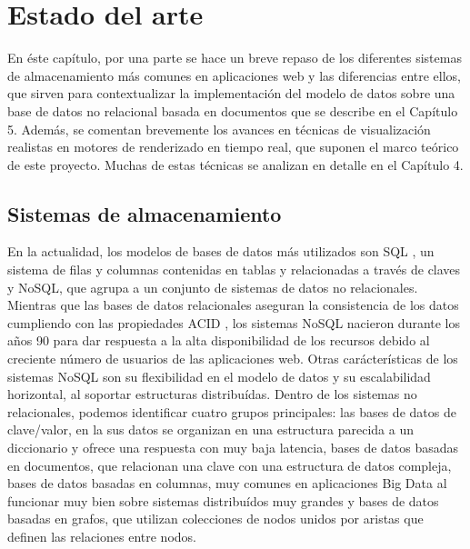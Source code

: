 \chapter{Estado del arte}
En \'este cap\'itulo, por una parte se hace un breve repaso de los diferentes sistemas de almacenamiento m\'as comunes en aplicaciones web
y las diferencias entre ellos, que sirven para contextualizar la implementaci\'on del modelo de datos sobre una base de datos no
relacional basada en documentos que se describe en el Cap\'itulo 5.
Adem\'as, se comentan brevemente los avances en t\'ecnicas de visualizaci\'on realistas en motores de renderizado en tiempo real, que suponen
el marco te\'orico de este proyecto. Muchas de estas t\'ecnicas se analizan en detalle en el Cap\'itulo 4.


\section{Sistemas de almacenamiento}
En la actualidad, los modelos de bases de datos m\'as utilizados son SQL \autocite{sql}, un sistema de filas y columnas
contenidas en tablas y relacionadas a trav\'es de claves y NoSQL, que agrupa a un conjunto de sistemas de datos no relacionales.
Mientras que las bases de datos relacionales aseguran la consistencia de los datos cumpliendo con las propiedades ACID
\autocite{acid}, los sistemas NoSQL nacieron durante los a\~nos 90 para dar respuesta a la alta disponibilidad de los recursos debido al creciente
n\'umero de usuarios de las aplicaciones web. Otras car\'acter\'isticas de los sistemas NoSQL son su flexibilidad en el modelo de datos
y su escalabilidad horizontal, al soportar estructuras distribu\'idas. Dentro de los sistemas no relacionales, podemos identificar
cuatro grupos principales: las bases de datos de clave/valor, en la sus datos se organizan en una estructura parecida a un diccionario
y ofrece una respuesta con muy baja latencia, bases de datos basadas en documentos, que relacionan una clave con una estructura
de datos compleja, bases de datos basadas en columnas, muy comunes en aplicaciones Big Data al funcionar muy bien sobre sistemas
distribu\'idos muy grandes y bases de datos basadas en grafos, que utilizan colecciones de nodos unidos por aristas que definen
las relaciones entre nodos.

